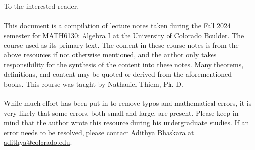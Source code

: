 To the interested reader,
\\
\\
This document is a compilation of lecture notes taken during the Fall 2024 semester for MATH6130: Algebra I at the University of Colorado Boulder. The course used \cite{dummit2004abstract} as its primary text. The content in these course notes is from the above resources if not otherwise mentioned, and the author only takes responsibility for the synthesis of the content into these notes. Many theorems, definitions, and content may be quoted or derived from the aforementioned books. This course was taught by Nathaniel Thiem, Ph. D.
\\
\\
While much effort has been put in to remove typos and mathematical errors, it is very likely that some errors, both small and large, are present. Please keep in mind that the author wrote this resource during his undergraduate studies. If an error needs to be resolved, please contact Adithya Bhaskara at \href{mailto:adithya@colorado.edu}{adithya@colorado.edu}.
\\
\\
\vfill
{}